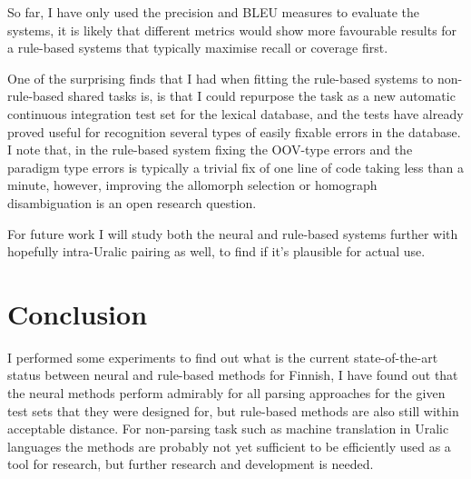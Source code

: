 \documentclass{flammie}
\newif\ifcameraready{}
\begin{document}
So far, I have only used the precision and BLEU measures to evaluate the
systems, it is likely that different metrics would show more favourable
results for a rule-based systems that typically maximise recall or coverage
first.

One of the surprising finds that I had when fitting the rule-based systems to
non-rule-based shared tasks is, is that I could repurpose the task as
a new automatic continuous integration test set for the lexical database, and
the tests have already proved useful for recognition several types of easily
fixable errors in the database. I note that, in the rule-based system fixing
the OOV-type errors and the paradigm type errors is typically a trivial fix
of one line of code taking less than a minute, however, improving the
allomorph selection or homograph disambiguation is an open research question.

For future work I will study both the neural and rule-based systems further
with hopefully intra-Uralic pairing as well, to find if it's plausible for
actual use.

\section{Conclusion}
\label{sec:conclusion}

I performed some experiments to find out what is the current state-of-the-art
status between neural and rule-based methods for Finnish, I have found out that
the neural methods perform admirably for all parsing approaches for the given
test sets that they were designed for, but rule-based methods are also still
within acceptable distance. For non-parsing task such as machine translation in
Uralic languages the methods are probably not yet sufficient to be efficiently
used as a tool for research, but further research and development is needed.


\ifcameraready{}
\section*{Acknowledgments}

The author was employed by CLARIN-D during the writing of the article.

\fi



\end{document}
